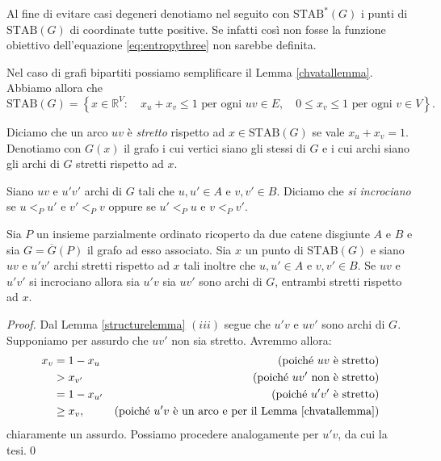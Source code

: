 Al fine di evitare casi degeneri denotiamo nel seguito con \(\text{STAB}^{*}(G)\) i punti di \(\text{STAB}(G)\) di coordinate tutte positive. Se infatti così non fosse la funzione obiettivo dell'equazione \eqref{eq:entropythree} non sarebbe definita.

Nel caso di grafi bipartiti possiamo semplificare il Lemma \ref{chvatallemma}. Abbiamo allora che
\[\text{STAB}(G)=\left\{x\in \mathbb{R}^V:\quad x_u + x_v\le 1 \text{ per ogni } uv\in E,\quad 0\le x_v\le 1 \text{ per ogni } v\in V\right\}.\]
\begin{definition}
  Diciamo che un arco \(uv\) è \emph{stretto} rispetto ad \(x\in\text{STAB}(G)\) se vale \(x_u+x_v=1\). Denotiamo con \(G(x)\) il grafo i cui vertici siano gli stessi di \(G\) e i cui archi siano gli archi di \(G\) stretti rispetto ad \(x\). 
\end{definition}
\begin{definition}
  Siano \(uv\) e \(u'v'\) archi di \(G\) tali che \(u,u'\in A\) e \(v,v'\in B\). Diciamo che \emph{si incrociano} se \(u<_{P}u'\) e \(v'<_{P}v\) oppure se \(u'<_{P}u\) e \(v<_{P}v'\). 
\end{definition}
\begin{lemma}
  \label{crossinglemma} Sia \(P\) un insieme parzialmente ordinato ricoperto da due catene disgiunte \(A\) e \(B\) e sia \(G=\overline{G}(P)\) il grafo ad esso associato. Sia \(x\) un punto di \(\text{STAB}(G)\) e siano \(uv\) e \(u'v'\) archi stretti rispetto ad \(x\) tali inoltre che \(u,u'\in A\) e \(v,v'\in B\). Se \(uv\) e \(u'v'\) si incrociano allora sia \(u'v\) sia \(uv'\) sono archi di \(G\), entrambi stretti rispetto ad \(x\). 
\end{lemma}
\begin{proof}
  Dal Lemma \ref{structurelemma} \((iii)\) segue che \(u'v\) e \(uv'\) sono archi di \(G\). Supponiamo per assurdo che \(uv'\) non sia stretto. Avremmo allora: 
  \begin{align}
    x_v &= 1-x_u &\text{(poich\'e } uv \text{ \`e stretto)}\nonumber \\
    &> x_{v'} &\text{(poich\'e } uv' \text{ non \`e stretto)}\nonumber \\
    &= 1-x_{u'} &\text{(poich\'e } u'v' \text{ \`e stretto)}\nonumber \\
    &\ge x_{v}, &\text{(poich\'e } u'v \text{ \`e un arco e per il Lemma \ref{chvatallemma})}\nonumber 
  \end{align}
  chiaramente un assurdo. Possiamo procedere analogamente per \(u'v\), da cui la tesi.\qed 
\end{proof}
